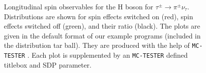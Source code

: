 \documentclass[]{Tauola_interface_design}
\begin{document}
\begin{figure}[h!]
\centering
{}
\caption{Longitudinal spin observables for the H boson for $\tau^{\pm}\rightarrow \pi^{\pm} \nu_{\tau}$.
Distributions are shown for spin effects switched on (red), spin effects switched off (green), and their ratio (black). The plots are given 
 in the default  format of our example programs 
(included in the distribution tar ball). 
They are  produced with the help of  {\tt MC-TESTER} \cite{Davidson:2008ma}.
Each plot is supplemented by an {\tt MC-TESTER} defined titlebox and SDP parameter.
 }
\end{figure}
\end{document}
